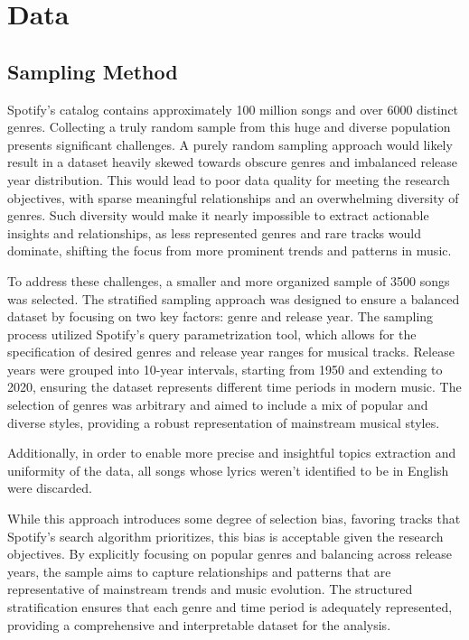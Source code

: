 \chapter{Data}
\label{cha:data}



\section{Sampling Method}
\label{sec:samplingmethod}


Spotify’s catalog contains approximately 100 million songs and over 6000
distinct genres. Collecting a truly random sample from this huge and diverse
population presents significant challenges. A purely random sampling approach
would likely result in a dataset heavily skewed towards obscure genres and
imbalanced release year distribution. This would lead to poor data quality for
meeting the research objectives, with sparse meaningful relationships and an
overwhelming diversity of genres. Such diversity would make it nearly
impossible to extract actionable insights and relationships, as less
represented genres and rare tracks would dominate, shifting the focus from more
prominent trends and patterns in music.


To address these challenges, a smaller and more organized sample of 3500 songs
was selected. The stratified sampling approach was designed to ensure a
balanced dataset by focusing on two key factors: genre and release year. The
sampling process utilized Spotify's query parametrization tool, which allows
for the specification of desired genres and release year ranges for musical
tracks. Release years were grouped into 10-year intervals, starting from 1950
and extending to 2020, ensuring the dataset represents different time periods
in modern music. The selection of genres was arbitrary and aimed to include a
mix of popular and diverse styles, providing a robust representation of
mainstream musical styles.

Additionally, in order to enable more precise and insightful topics extraction
and uniformity of the data, all songs whose lyrics weren't identified to be in
English were discarded.
 
While this approach introduces some degree of selection bias, favoring tracks
that Spotify's search algorithm prioritizes, this bias is acceptable given the
research objectives. By explicitly focusing on popular genres and balancing
across release years, the sample aims to capture relationships and patterns
that are representative of mainstream trends and music evolution. The
structured stratification ensures that each genre and time period is adequately
represented, providing a comprehensive and interpretable dataset for  the
analysis.


